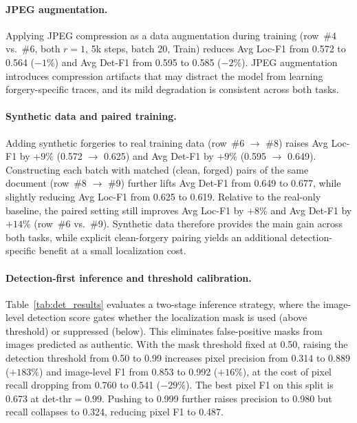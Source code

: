 \documentclass[sigconf, screen, review, anonymous]{acmart}
\begin{document}
\paragraph{JPEG augmentation.} Applying JPEG compression as a data augmentation during training (row~\#4 vs.\ \#6, both $r{=}1$, 5k steps, batch 20, Train) reduces Avg Loc-F1 from 0.572 to 0.564 ($-1\%$) and Avg Det-F1 from 0.595 to 0.585 ($-2\%$). JPEG augmentation introduces compression artifacts that may distract the model from learning forgery-specific traces, and its mild degradation is consistent across both tasks.

\paragraph{Synthetic data and paired training.} Adding synthetic forgeries to real training data (row~\#6 $\rightarrow$ \#8) raises Avg Loc-F1 by $+9\%$ (0.572 $\rightarrow$ 0.625) and Avg Det-F1 by $+9\%$ (0.595 $\rightarrow$ 0.649). Constructing each batch with matched (clean, forged) pairs of the same document (row~\#8 $\rightarrow$ \#9) further lifts Avg Det-F1 from 0.649 to 0.677, while slightly reducing Avg Loc-F1 from 0.625 to 0.619. Relative to the real-only baseline, the paired setting still improves Avg Loc-F1 by $+8\%$ and Avg Det-F1 by $+14\%$ (row~\#6 vs.\ \#9). Synthetic data therefore provides the main gain across both tasks, while explicit clean-forgery pairing yields an additional detection-specific benefit at a small localization cost.

\paragraph{Detection-first inference and threshold calibration.} Table~\ref{tab:det_results} evaluates a two-stage inference strategy, where the image-level detection score gates whether the localization mask is used (above threshold) or suppressed (below). This eliminates false-positive masks from images predicted as authentic. With the mask threshold fixed at 0.50, raising the detection threshold from 0.50 to 0.99 increases pixel precision from 0.314 to 0.889 ($+183\%$) and image-level F1 from 0.853 to 0.992 ($+16\%$), at the cost of pixel recall dropping from 0.760 to 0.541 ($-29\%$). The best pixel F1 on this split is 0.673 at det-thr$=0.99$. Pushing to 0.999 further raises precision to 0.980 but recall collapses to 0.324, reducing pixel F1 to 0.487.
\end{document}
